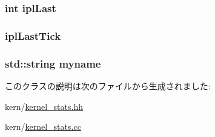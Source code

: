 \label{classKernel_1_1Statistics_a7677e0279f2b7fe2268ef8803d18f5bb}
\hypertarget{classKernel_1_1Statistics_a68a44a29c95e4c51a26809ed832dd500}{
\subsubsection[{iplLast}]{\setlength{\rightskip}{0pt plus 5cm}int {\bf iplLast}}}
\label{classKernel_1_1Statistics_a68a44a29c95e4c51a26809ed832dd500}
\hypertarget{classKernel_1_1Statistics_a29e66bc82eeb467c26bbd6958df2eb98}{
\subsubsection[{iplLastTick}]{ {\bf iplLastTick}}}
\label{classKernel_1_1Statistics_a29e66bc82eeb467c26bbd6958df2eb98}
\hypertarget{classKernel_1_1Statistics_a82f8b285df43a96ef98c9860d59d26c4}{
\subsubsection[{myname}]{\setlength{\rightskip}{0pt plus 5cm}std::string {\bf myname}}}
\label{classKernel_1_1Statistics_a82f8b285df43a96ef98c9860d59d26c4}


このクラスの説明は次のファイルから生成されました:\begin{DoxyCompactItemize}
\item 
kern/\hyperlink{kern_2kernel__stats_8hh}{kernel\_\-stats.hh}\item 
kern/\hyperlink{kern_2kernel__stats_8cc}{kernel\_\-stats.cc}\end{DoxyCompactItemize}
